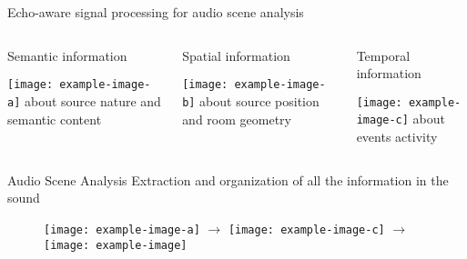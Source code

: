 \begin{frame}[t]{Echo-aware signal processing for \alert{audio scene analysis}}

    \begin{columns}
        \begin{column}[t]{0.3\textwidth}
            \centering
            \alert{Semantic} information

            \vspace*{0.5em}
            \texttt{[image: example-image-a]}
            about source nature and semantic content
        \end{column}
        \begin{column}[t]{0.3\textwidth}
            \centering
            \alert{Spatial} information

            \vspace*{0.5em}
            \texttt{[image: example-image-b]}
            about source position and room geometry
        \end{column}
        \begin{column}[t]{0.3\textwidth}
            \centering
            \alert{Temporal} information

            \vspace*{0.5em}
            \texttt{[image: example-image-c]}
            about events activity
        \end{column}
    \end{columns}

    \vfill
    \begin{mydefblock}{Audio Scene Analysis}
        Extraction and organization of all the information in the sound
    \end{mydefblock}

    \vfill
    \begin{figure}
        \centering
        \texttt{[image: example-image-a]}
        \hfill
        $\rightarrow$
        \hfill
        \texttt{[image: example-image-c]}
        \hfill
        $\rightarrow$
        \hfill
        \texttt{[image: example-image]}
    \end{figure}

\end{frame}

